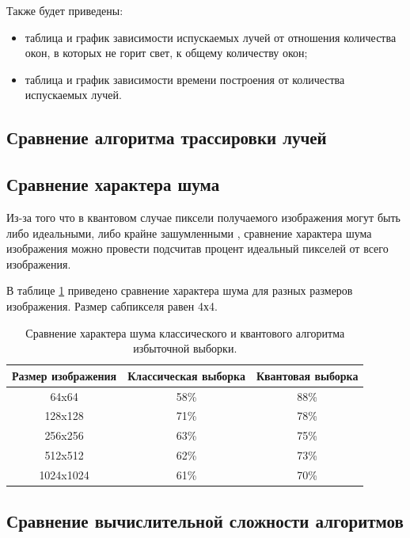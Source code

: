 Также будет приведены:
\begin{itemize}
	\item таблица и график зависимости испускаемых лучей от отношения количества окон, в которых не горит свет, к общему количеству окон; 
	\item таблица и график зависимости времени построения от количества испускаемых лучей.
\end{itemize}


\subsection{Сравнение алгоритма трассировки лучей}

\subsection{Сравнение характера шума}

Из-за того что в квантовом случае пиксели получаемого изображения могут быть либо идеальными, либо крайне зашумленными \cite{PQC-classic}, сравнение характера шума  изображения можно провести подсчитав процент идеальный пикселей от всего изображения. 

В таблице \ref{tab:noise_02} приведено сравнение характера шума для разных размеров изображения. Размер сабпикселя равен 4х4.

\begin{table}[h!]
	\caption{Сравнение характера шума классического и квантового алгоритма избыточной выборки.}
	\label{tab:noise_02}
	\begin{center}
		\begin{tabular}{|c| c | c|} 
			\hline
			Размер изображения & Классическая выборка & Квантовая выборка \\  
			\hline
			64x64 & 58\% & 88\%  \\
			\hline
			128x128 & 71\% & 78\% \\
			\hline
			256x256 & 63\% & 75\% \\
			\hline
			512x512 & 62\% & 73\% \\
			\hline
			1024x1024 & 61\% & 70\% \\
			\hline
		\end{tabular}
	\end{center}
\end{table}

\subsection{Сравнение вычислительной сложности алгоритмов}

